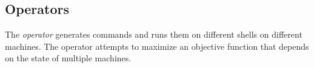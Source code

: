 \subsection{Operators}\label{operator}

The \emph{operator} generates commands and runs them on different shells on different machines. The operator attempts to maximize an objective function that depends on the state of multiple machines. 
